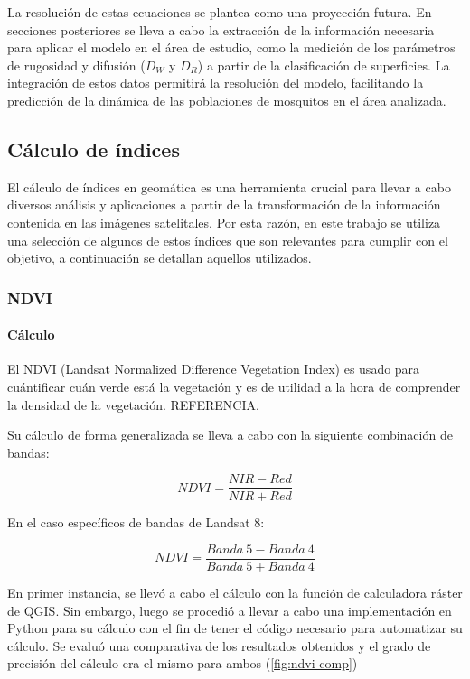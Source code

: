 La resolución de estas ecuaciones se plantea como una proyección futura. En secciones posteriores se lleva a cabo la extracción de la información necesaria para aplicar el modelo en el área de estudio, como la medición de los parámetros de rugosidad y difusión ($D_W$ y $D_R$) a partir de la clasificación de superficies. La integración de estos datos permitirá la resolución del modelo, facilitando la predicción de la dinámica de las poblaciones de mosquitos en el área analizada.

\subsection{Cálculo de índices}

El cálculo de índices en geomática es una herramienta crucial para llevar a cabo diversos análisis y aplicaciones a partir de la transformación de la información contenida en las imágenes satelitales. Por esta razón, en este trabajo se utiliza una selección de algunos de estos índices que son relevantes para cumplir con el objetivo, a continuación se detallan aquellos utilizados.

\subsubsection{NDVI} \label{ndvi}

\paragraph{Cálculo}

El NDVI (Landsat Normalized Difference Vegetation Index) es usado para cuántificar cuán verde está la vegetación y es de utilidad a la hora de comprender la densidad de la vegetación. REFERENCIA.

Su cálculo de forma generalizada se lleva a cabo con la siguiente combinación de bandas:

$$NDVI=\frac{NIR-Red}{NIR+Red}$$

En el caso específicos de bandas de Landsat 8:

$$NDVI=\frac{Banda~5 - Banda~4}{Banda~5 + Banda~4}$$

En primer instancia, se llevó a cabo el cálculo con la función de calculadora ráster de QGIS. Sin embargo, luego se procedió a llevar a cabo una implementación en Python para su cálculo con el fin de tener el código necesario para automatizar su cálculo. Se evaluó una comparativa de los resultados obtenidos y el grado de precisión del cálculo era el mismo para ambos (\figurename \ref{fig:ndvi-comp})

